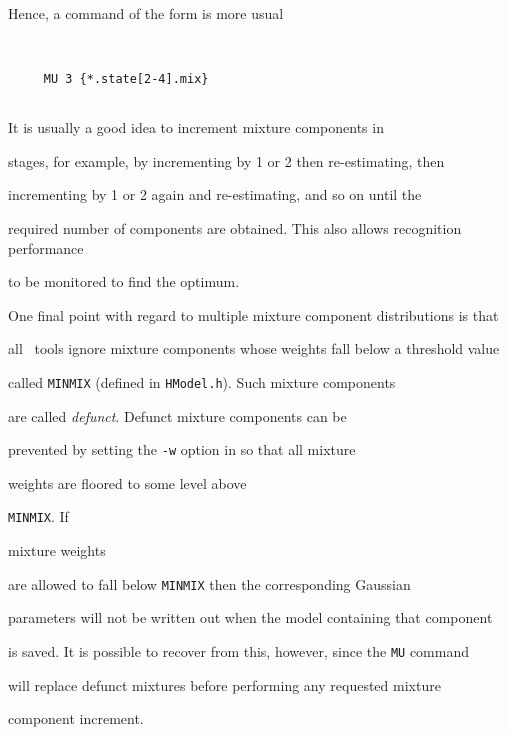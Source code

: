 Hence, a command of the form is more usual


\begin{verbatim}


     MU 3 {*.state[2-4].mix}


\end{verbatim}


It is usually a good idea to increment mixture components in


stages, for example, by incrementing by 1 or 2 then re-estimating, then


incrementing by 1 or 2 again and re-estimating, and so on until the


required number of components are obtained.  This also allows recognition performance


to be monitored to find the optimum.





One final point with regard to multiple mixture component distributions is that


all \HTK\ tools ignore mixture components whose weights fall below a threshold value


called \texttt{MINMIX} (defined in \texttt{HModel.h}).  Such mixture components


are called {\it defunct}.  Defunct mixture components can be


prevented by setting the \texttt{-w} option in  so that all mixture


weights are floored to some level above 


\texttt{MINMIX}.  If 


mixture weights


are allowed to fall below \texttt{MINMIX} then the corresponding Gaussian


parameters will not be written out when the model containing that component


is saved.  It is possible to recover from this, however, since the \texttt{MU} command


will replace defunct mixtures before performing any requested mixture


component increment.










